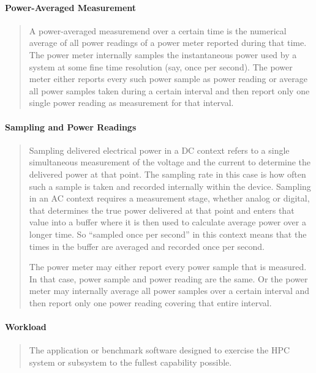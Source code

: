 \paragraph*{Power-Averaged Measurement}
\begin{quote}
A power-averaged measuremend over a certain time is the numerical average of all power readings of a power meter reported during that time.
The power meter internally samples the instantaneous power used by a system at some fine time resolution (say, once per second).
The power meter either reports every such power sample as power reading or average all power samples taken during a certain interval and then report only one single power reading as measurement for that interval.
\end{quote}

\paragraph*{Sampling and Power Readings}
\begin{quote}
Sampling delivered electrical power in a DC context refers to a single simultaneous measurement
of the voltage and the current to determine the delivered power at that point.  The sampling
rate in this case is how often such a sample is taken and recorded internally within the device.
Sampling in an AC context requires a measurement stage, whether analog or digital, that determines
the true power delivered at that point and enters that value into a buffer where it is then used
to calculate average power over a longer time.  So ``sampled once per second'' in this context
means that the times in the buffer are averaged and recorded once per second.

The power meter may either report every power sample that is measured.
In that case, power sample and power reading are the same.
Or the power meter may internally average all power samples over a certain interval and then report only one power reading covering that entire interval.
\end{quote}

\paragraph*{Workload}
\begin{quote}
The application or benchmark software designed to exercise the HPC system or subsystem to
the fullest capability possible.
\end{quote}

